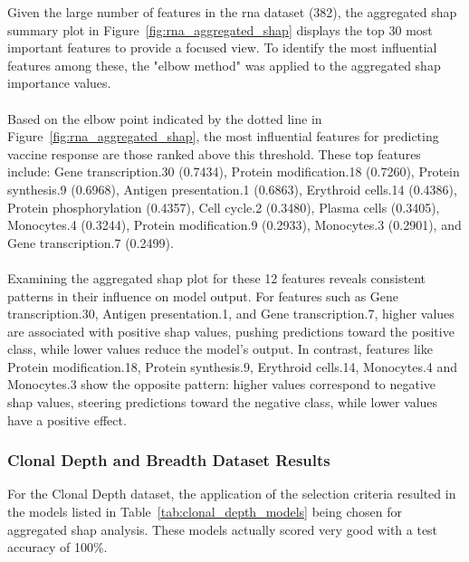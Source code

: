 \documentclass[12pt,a4paper]{report}
\begin{document}
\noindent
Given the large number of features in the \acrshort{rna} dataset (382), the aggregated \gls{shap} summary plot in Figure~\ref{fig:rna_aggregated_shap} displays the top 30 most important features to provide a focused view. To identify the most influential features among these, the "elbow method" was applied to the aggregated \gls{shap} importance values.\\
\\
Based on the elbow point indicated by the dotted line in Figure~\ref{fig:rna_aggregated_shap}, the most influential features for predicting vaccine response are those ranked above this threshold. These top features include: Gene transcription.30 (0.7434), Protein modification.18 (0.7260), Protein synthesis.9 (0.6968), Antigen presentation.1 (0.6863), Erythroid cells.14 (0.4386), Protein phosphorylation (0.4357), Cell cycle.2 (0.3480), Plasma cells (0.3405), Monocytes.4 (0.3244), Protein modification.9 (0.2933), Monocytes.3 (0.2901), and Gene transcription.7 (0.2499).\\
\\
Examining the aggregated \gls{shap} plot for these 12 features reveals consistent patterns in their influence on model output. For features such as Gene transcription.30, Antigen presentation.1, and Gene transcription.7, higher values are associated with positive \gls{shap} values, pushing predictions toward the positive class, while lower values reduce the model's output. In contrast, features like Protein modification.18, Protein synthesis.9, Erythroid cells.14, Monocytes.4 and Monocytes.3 show the opposite pattern: higher values correspond to negative \gls{shap} values, steering predictions toward the negative class, while lower values have a positive effect.

\subsubsection*{Clonal Depth and Breadth Dataset Results}
For the Clonal Depth dataset, the application of the selection criteria resulted in the models listed in Table~\ref{tab:clonal_depth_models} being chosen for aggregated \gls{shap} analysis. These models actually scored very good with a test accuracy of 100\%.\\
\end{document}
